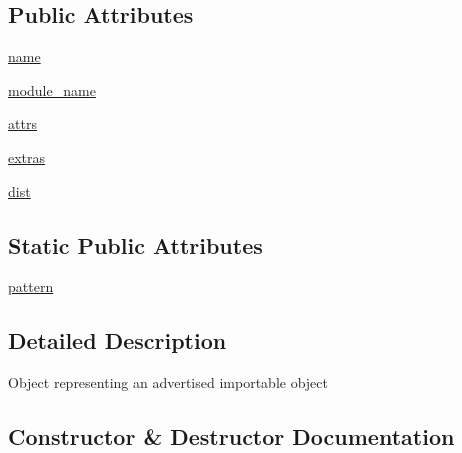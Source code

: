 \subsection*{Public Attributes}
\begin{DoxyCompactItemize}
\item 
\hyperlink{classpkg__resources_1_1EntryPoint_a91cc24785899a45662cb316373d754d5}{name}
\item 
\hyperlink{classpkg__resources_1_1EntryPoint_a2b39408f1bde9801e87a597f3b461b3b}{module\+\_\+name}
\item 
\hyperlink{classpkg__resources_1_1EntryPoint_aa9c9f7e56c09f62289e21c2fd012c11d}{attrs}
\item 
\hyperlink{classpkg__resources_1_1EntryPoint_a71c2a88d7240ad67d94466f4de66597d}{extras}
\item 
\hyperlink{classpkg__resources_1_1EntryPoint_aaae30521771283be73c089513c377773}{dist}
\end{DoxyCompactItemize}
\subsection*{Static Public Attributes}
\begin{DoxyCompactItemize}
\item 
\hyperlink{classpkg__resources_1_1EntryPoint_aec11de06a8c824a9b03584cecd39a1a6}{pattern}
\end{DoxyCompactItemize}


\subsection{Detailed Description}
\begin{DoxyVerb}Object representing an advertised importable object\end{DoxyVerb}
 

\subsection{Constructor \& Destructor Documentation}
\mbox{\label{classpkg__resources_1_1EntryPoint_adf880358e5306e9187c4ea2538d321c8}} 
